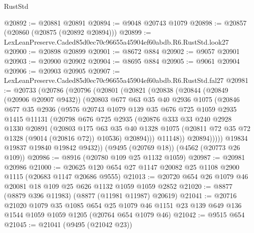 \begin{lexlean}{RustStd}
\begin{coremodule}
@20892 := @20881 @20891
@20894 := @9048 @20743 @1079
@20898 := @20857 (@20860 (@20875 (@20892 @20894)))
@20899 := LexLeanPreserve.Caded85d0ec70c96655a45904ef60abdb.R6.RustStd.look27
@20900 := @20898 @20899
@20901 := @8672 @884
@20902 := @9057 @20901
@20903 := @20900 @20902
@20904 := @8695 @884
@20905 := @9061 @20904
@20906 := @20903 @20905
@20907 := LexLeanPreserve.Caded85d0ec70c96655a45904ef60abdb.R6.RustStd.fal27
@20981 := @20733
    (@20786
      (@20796
        (@20801
          (@20821
            (@20838
              (@20844
                (@20849 (@20906 @20907 @9432))
                (@20803
                  @677
                  @63
                  @35
                  @40
                  @2936
                  @1075
                  (@20846
                    @677
                    @35
                    @2936
                    (@9576
                      @20743
                      @1079
                      @139
                      @35
                      @676
                      @725
                      @1059
                      @2935
                      @1415
                      @11131
                      (@20798
                        @676
                        @725
                        @2935
                        (@20876
                          @333
                          @33
                          @240
                          @2928
                          @1330
                          @20891
                          (@20803
                            @175
                            @63
                            @35
                            @40
                            @1328
                            @1075
                            (@20811 @72 @35 @72 @1328 (@9014 (@20816 @72)) @10536)
                            @20894)))
                      @11148))
                  @20894)))))
        @19834
        @19837
        @19840
        @19842
        @9432))
    (@9495 (@20769 @18))
    (@4562 (@20773 @26 @109))
@20986 := @8916 (@20780 @109 @25 @1132 @1059)
@20987 := @20981 @20986
@21000 := @20625 @120 @654 @27 @1147 @20082 @25 @1108 @2900 @1115 (@20683 @1147 @20686 @9555)
@21013 := @20720 @654 @26 @1079 @46 @20081 @18 @109 @25 @626 @1132 @1059 @1059 @2852
@21020 := @8877 (@8879 @396 @11983) (@8877 (@11981 @11987) @20619)
@21041 := @20716
    @21020
    @1079
    @35
    @1085
    @654
    @25
    @1079
    @46
    @1151
    @23
    @139
    @649
    @136
    @1544
    @1059
    @1059
    @1205
    (@20764 @654 @1079 @46)
@21042 := @9515 @654
@21045 := @21041 (@9495 (@21042 @23))

\end{coremodule}
\end{lexlean}
